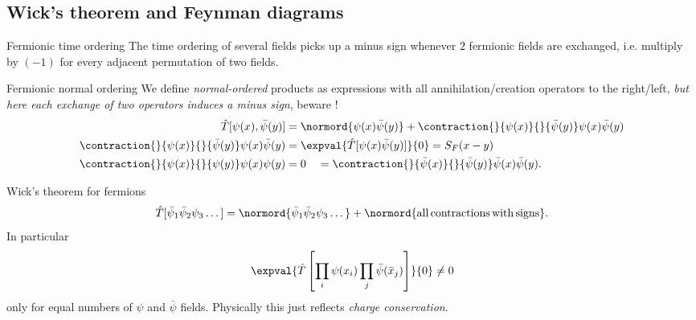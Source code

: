 \subsection{Wick's theorem and Feynman diagrams}
\begin{mybox}{Fermionic time ordering}
	The time ordering of several fields picks up a minus sign whenever $2$ fermionic fields are exchanged, i.e. multiply by $(-1)$ for every adjacent permutation of two fields.
\end{mybox}
\begin{mybox}{Fermionic normal ordering}
	We define \emph{normal-ordered} products as expressions with all annihilation/creation operators to the right/left, \emph{but here each exchange of two operators induces a minus sign}, beware !
	\begin{align}
		\hat{T}[\psi(x),\bar{\psi}(y)] &= \normord{\psi(x) \bar{\psi}(y)} + \contraction{}{\psi(x)}{}{\bar{\psi}(y)} \psi(x) \bar{\psi}(y) \\
		\contraction{}{\psi(x)}{}{\bar{\psi}(y)} \psi(x) \bar{\psi}(y) &= \expval{\hat{T}[\psi(x) \bar{\psi}(y)]}{0} = S_F(x-y) \\
		\contraction{}{\psi(x)}{}{\psi(y)} \psi(x) \psi(y) &= 0 \quad = \contraction{}{\bar{\psi}(x)}{}{\bar{\psi}(y)}\bar{\psi}(x) \bar{\psi}(y).
	\end{align}
\end{mybox}
\begin{mybox}{Wick's theorem for fermions}
	\begin{equation}
	\hat{T}[\bar{\psi}_1 \bar{\psi}_2 \psi_3 \dots ] = \normord{\bar{\psi}_1 \bar{\psi}_2 \psi_3 \dots } + \normord{\mathrm{all\,contractions\,with\,signs}}.
	\end{equation}
	In particular
	\begin{equation}
		\expval{\hat{T}\left[\prod_i \psi(x_i) \prod_j \bar{\psi}(\bar{x}_j) \right]}{0} \neq 0
	\end{equation}
	only for equal numbers of $\psi$ and $\bar{\psi}$ fields. Physically this just reflects \emph{charge conservation}.
\end{mybox}

